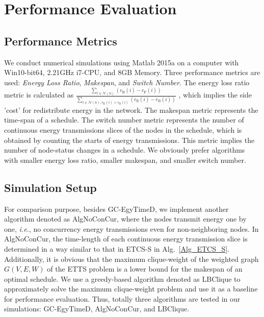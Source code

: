 \documentclass[journal,10pt]{IEEEtran}
\begin{document}
\section{Performance Evaluation}
\label{sec_sim}
\subsection{Performance Metrics}
We conduct numerical simulations using Matlab 2015a on a computer with Win10-bit64, 2.21GHz i7-CPU, and 8GB Memory. Three performance metrics are used: \textit{Energy Loss Ratio}, \textit{Makespan}, and \textit{Switch Number}. The energy loss ratio metric is calculated as  $\frac{\sum_{i{\in}\mathcal{N}(n)}(e_\text{B}(i){-}e_\text{F}(i))}{\sum_{i{\in}\mathcal{N}(n),e_\text{E}(i){>}e_\text{B}(i)}(e_\text{E}(i){-}e_\text{B}(i))}$   , which implies the side 'cost' for redistribute energy in the network. The makespan metric represents the time-span of a schedule. The switch number metric represents the number of continuous energy transmissions slices of the nodes in the schedule, which is obtained by counting the starts of energy transmissions. This metric implies the number of node-status changes in a schedule. We obviously prefer algorithms with smaller energy loss ratio, smaller makespan, and smaller switch number.

\subsection{Simulation Setup}
For comparison purpose, besides GC-EgyTimeD, we implement another algorithm denoted as AlgNoConCur, where the nodes transmit energy one by one, \textit{i.e.}, no concurrency energy transmissions even for non-neighboring nodes. In AlgNoConCur, the time-length of each continuous energy transmission slice is determined in a way similar to that in ETCS-S in Alg.~\ref{Alg_ETCS_S}. Additionally, it is obvious that the maximum clique-weight of the weighted graph $G(V,E,W)$ of the ETTS problem is a lower bound for the makespan of an optimal schedule. We use a greedy-based algorithm denoted as LBClique to approximately solve the maximum clique-weight problem and use it as a baseline for performance evaluation. Thus, totally three algorithms are tested in our simulations: GC-EgyTimeD, AlgNoConCur, and LBClique.
\end{document}
